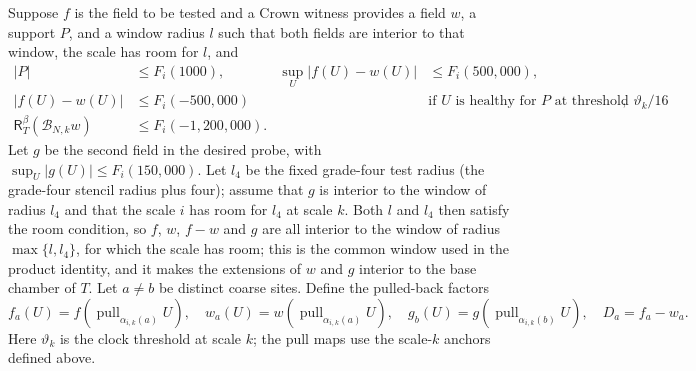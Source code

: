 Suppose $f$ is the field to be tested and a Crown witness provides a field
$w$, a support $P$, and a window radius $l$ such that both fields are interior
to that window, the scale has room for $l$, and
\begin{align}
 |P|&\le F_i(1000), &
 \sup_U|f(U)-w(U)|&\le F_i(500{,}000),\\
 |f(U)-w(U)|&\le F_i(-500{,}000)
   &&\text{if $U$ is healthy for $P$ at threshold $\vartheta_k/16$},\\
 \mathsf R_T^\beta(\mathcal B_{N,k}w)&\le F_i(-1{,}200{,}000).
 \label{eq:ex-trace-crown-witness}
\end{align}
Let $g$ be the second field in the desired probe, with
$\sup_U|g(U)|\le F_i(150{,}000)$. Let $l_4$ be the fixed grade-four test
radius (the grade-four stencil radius plus four); assume that $g$ is
interior to the window of radius $l_4$ and that the scale $i$ has room for
$l_4$ at scale $k$. Both $l$ and $l_4$ then satisfy the room condition, so
$f$, $w$, $f-w$ and $g$ are all interior to the window of radius
$\max\{l,l_4\}$, for which the scale has room; this is the common window
used in the product identity, and it makes the extensions of $w$ and $g$
interior to the base chamber of $T$.
Let $a\ne b$ be distinct coarse sites. Define the pulled-back factors
\[
f_a(U)=f(\operatorname{pull}_{\alpha_{i,k}(a)} U),\quad
w_a(U)=w(\operatorname{pull}_{\alpha_{i,k}(a)} U),\quad
g_b(U)=g(\operatorname{pull}_{\alpha_{i,k}(b)} U),\quad
 D_a=f_a-w_a.
\]
Here $\vartheta_k$ is the clock threshold at scale $k$; the pull maps use
the scale-$k$ anchors defined above.

